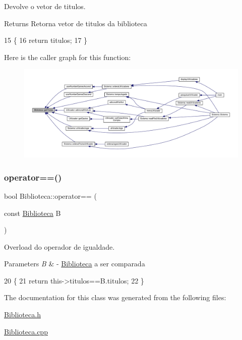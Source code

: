 Devolve o vetor de titulos. 

\begin{DoxyReturn}{Returns}
Retorna vetor de titulos da biblioteca 
\end{DoxyReturn}

\begin{DoxyCode}
15 \{
16     \textcolor{keywordflow}{return} titulos;
17 \}
\end{DoxyCode}
Here is the caller graph for this function\+:
\nopagebreak
\begin{figure}[H]
\begin{center}
\leavevmode
\includegraphics[width=350pt]{classBiblioteca_a03c1ebf76a4ace4f57000bb99a87bb88_icgraph}
\end{center}
\end{figure}
\mbox{\label{classBiblioteca_a962423a2d93507ad7348e9b8c83eb1b8}} 
\subsubsection{\texorpdfstring{operator==()}{operator==()}}
{\footnotesize\ttfamily bool Biblioteca\+::operator== (\begin{DoxyParamCaption}\item[{const \hyperlink{classBiblioteca}{Biblioteca}}]{B }\end{DoxyParamCaption})}



Overload do operador de igualdade. 


\begin{DoxyParams}{Parameters}
{\em B} & -\/ \hyperlink{classBiblioteca}{Biblioteca} a ser comparada \\
\hline
\end{DoxyParams}

\begin{DoxyCode}
20 \{
21     \textcolor{keywordflow}{return} this->titulos==B.titulos;
22 \}
\end{DoxyCode}


The documentation for this class was generated from the following files\+:\begin{DoxyCompactItemize}
\item 
\hyperlink{Biblioteca_8h}{Biblioteca.\+h}\item 
\hyperlink{Biblioteca_8cpp}{Biblioteca.\+cpp}\end{DoxyCompactItemize}
